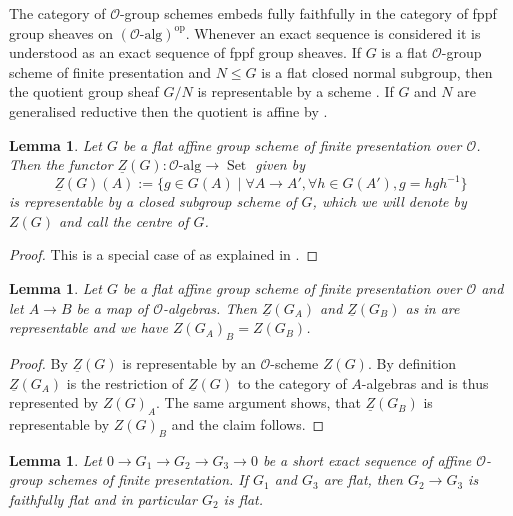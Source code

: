\documentclass{amsart}
\newtheorem{lem}[prop]{Lemma}
\theoremstyle{definition}
\theoremstyle{remark}
\DeclareMathOperator{\Set}{Set}
\newcommand{\OO}{\mathcal O}
\newcommand{\alg}{\mathrm{alg}}
\newcommand{\hyphen}{\text{-}}
\begin{document}
The category of $\OO$-group schemes embeds fully faithfully in the category of fppf group sheaves on $(\OO\hyphen\alg)^{\mathrm{op}}$. Whenever an exact sequence is considered it is understood as an exact sequence of fppf group sheaves. If $G$ is a flat $\OO$-group scheme of finite presentation and $N \leq G$ is a flat closed normal subgroup, then the quotient group sheaf $G/N$ is representable by a scheme \cite[Th\'eor\`eme 4.C]{Anantharaman}.
If $G$ and $N$ are generalised reductive then the quotient is affine by \cite[Theorem 9.4.1]{alper}.



\begin{lem}\label{ZGexists}
    Let $G$ be a flat affine group scheme of finite presentation over $\OO$. Then the functor $\underline Z(G) : \OO\hyphen\alg \to \Set$ given by
    $$\underline Z(G)(A) := \{g \in G(A) \mid \forall A \to A' , \forall h \in G(A') , g = hgh^{-1}\}$$
    is representable by a closed subgroup scheme of $G$, which we will denote by $Z(G)$ and call the \emph{centre} of $G$.
\end{lem}

\begin{proof}
    This is a special case of \cite[Expos\'e VIII, Th\'eorème 6.4]{SGA3Tome2} as explained in \cite[Expos\'e VIII, Exemples 6.5 (e)]{SGA3Tome2}.
\end{proof}

\begin{lem}\label{base_change_Z}
    Let $G$ be a flat affine group scheme of finite presentation over $\OO$ and let $A \to B$ be a map of $\OO$-algebras.
    Then $\underline Z(G_A)$ and $\underline Z(G_B)$ as in  are representable and we have $Z(G_A)_B = Z(G_B)$.
\end{lem}

\begin{proof}
    By  $\underline Z(G)$ is representable by an $\OO$-scheme $Z(G)$.
    By definition $\underline Z(G_A)$ is the restriction of $\underline Z(G)$ to the category of $A$-algebras and is thus represented by $Z(G)_A$.
    The same argument shows, that $\underline Z(G_B)$ is representable by $Z(G)_B$ and the claim follows.
\end{proof}

\begin{lem}\label{extofflatisflat}
    Let 
    $ 0 \to G_1 \to G_2 \to G_3 \to 0 $
    be a short exact sequence of affine $\OO$-group schemes of finite presentation. If $G_1$ and $G_3$ are flat, then $G_2 \to G_3$ is faithfully flat and in particular $G_2$ is flat.
\end{lem}
\end{document}

